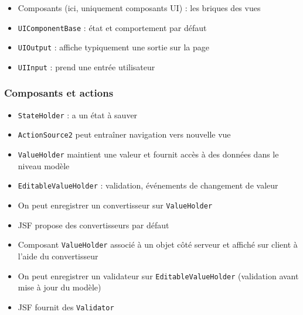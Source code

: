 \documentclass[english, french]{beamer}
\begin{document}
\begin{frame}
%
	\begin{itemize}
		\item Composants {\tiny (ici, uniquement composants UI)} : les briques des vues
		\item \texttt{UIComponentBase} : état et comportement par défaut
		\item \texttt{UIOutput} : affiche {\tiny typiquement} une sortie sur la page
		\item \texttt{UIInput} : prend une entrée utilisateur
	\end{itemize}
\end{frame}

\begin{frame}
	\frametitle{Composants et actions}
	\begin{itemize}
		\item \texttt{StateHolder} : a un état à sauver
		\item \texttt{ActionSource2} peut entraîner navigation vers nouvelle vue
		\item \texttt{ValueHolder} maintient une valeur et fournit accès à des données dans le niveau modèle
		\item \texttt{EditableValueHolder} : validation, événements de changement de valeur
		\item On peut enregistrer un convertisseur sur \texttt{ValueHolder}
		\item JSF propose des convertisseurs par défaut
		\item Composant \texttt{ValueHolder} associé à un objet côté serveur et affiché sur client à l’aide du convertisseur
		\item On peut enregistrer un validateur sur \texttt{EditableValueHolder} (validation avant mise à jour du modèle)
		\item JSF fournit des \texttt{Validator}
	\end{itemize}
\end{frame}
\end{document}

